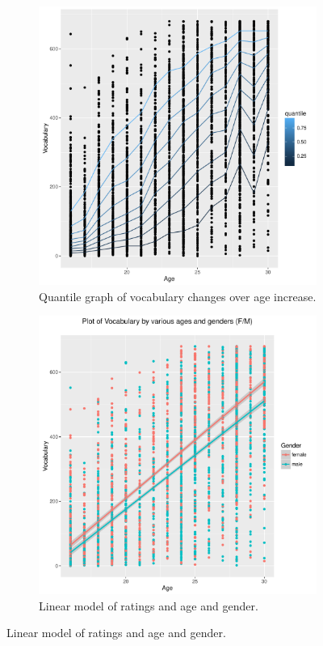 \documentclass[12pt]{elsarticle}
\begin{document}
\begin{figure}
\begin{subfigure}{.5\textwidth}
  \centering
  \includegraphics[width=.9\textwidth]{quantile-vocab-age.pdf}
  \caption{Quantile graph of vocabulary changes over age increase.}
  \label{fig:sfig1}
\end{subfigure}%
\begin{subfigure}{.5\textwidth}
  \centering
  \includegraphics[width=.9\textwidth]{wordbank-age-gender.pdf}
  \caption{Linear model of ratings and age and gender.}
  \label{fig:sfig2}
\end{subfigure}
\label{fig:fig}
\end{figure}
\end{document}

